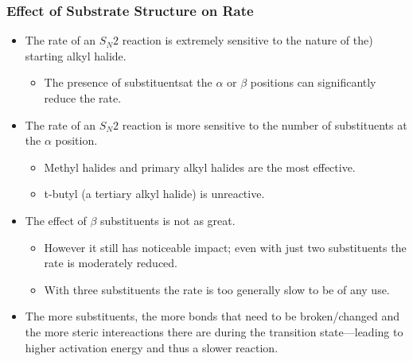 \documentclass[12pt,a4paper]{article}
\begin{document}
\begin{itemize}
    \subsubsection{Effect of Substrate Structure on Rate}
    \begin{itemize}
        \item The rate of an \(S_N2\) reaction is extremely sensitive to the nature of the) starting alkyl halide. 
            \begin{itemize}
                \item The presence of substituentsat the $\alpha$ or $\beta$ positions can significantly reduce the rate. 
            \end{itemize}
        \item The rate of an \(S_N2\) reaction is more sensitive to the number of substituents at the $\alpha$ position. 
            \begin{itemize}
                \item Methyl halides and primary alkyl halides are the most effective.
                \item t-butyl (a tertiary alkyl halide) is unreactive.
            \end{itemize}
        \item The effect of $\beta$ substituents is not as great.
            \begin{itemize}
                \item However it still has noticeable impact; even with just two substituents the rate is moderately reduced.
                \item With three substituents the rate is too generally slow to be of any use.
            \end{itemize}
        \item The more substituents, the more bonds that need to be broken/changed and the more steric intereactions there are during the transition state---leading to higher activation energy and thus a slower reaction.
        \end{itemize}

\end{itemize}
\end{document}
